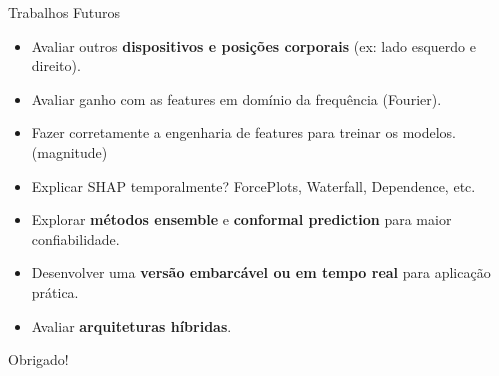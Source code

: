 \documentclass[10pt]{beamer}
\begin{document}

\begin{frame}{Trabalhos Futuros}
  \begin{itemize}
    \item Avaliar outros \textbf{dispositivos e posições corporais} (ex: lado esquerdo e direito).
    \item Avaliar ganho com as features em domínio da frequência (Fourier).
    \item Fazer corretamente a engenharia de features para treinar os modelos. (magnitude)
    \item Explicar SHAP temporalmente? ForcePlots, Waterfall, Dependence, etc.
    \item Explorar \textbf{métodos ensemble} e \textbf{conformal prediction} para maior confiabilidade.
    \item Desenvolver uma \textbf{versão embarcável ou em tempo real} para aplicação prática.
    \item Avaliar \textbf{arquiteturas híbridas}.
  \end{itemize}
\end{frame}


\begin{frame}[standout]
  Obrigado! \\
\end{frame}
\end{document}
